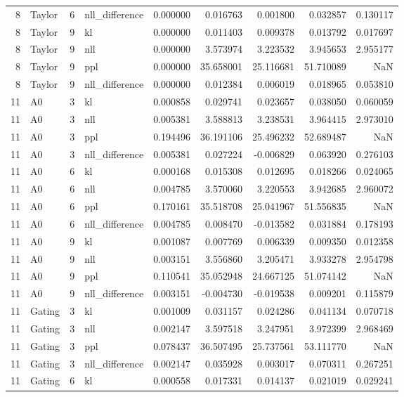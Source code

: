 \begin{tabular}{rlrlrrrrr}
8 & Taylor & 6 & nll_difference & 0.000000 & 0.016763 & 0.001800 & 0.032857 & 0.130117 \\
8 & Taylor & 9 & kl & 0.000000 & 0.011403 & 0.009378 & 0.013792 & 0.017697 \\
8 & Taylor & 9 & nll & 0.000000 & 3.573974 & 3.223532 & 3.945653 & 2.955177 \\
8 & Taylor & 9 & ppl & 0.000000 & 35.658001 & 25.116681 & 51.710089 & NaN \\
8 & Taylor & 9 & nll_difference & 0.000000 & 0.012384 & 0.006019 & 0.018965 & 0.053810 \\
11 & A0 & 3 & kl & 0.000858 & 0.029741 & 0.023657 & 0.038050 & 0.060059 \\
11 & A0 & 3 & nll & 0.005381 & 3.588813 & 3.238531 & 3.964415 & 2.973010 \\
11 & A0 & 3 & ppl & 0.194496 & 36.191106 & 25.496232 & 52.689487 & NaN \\
11 & A0 & 3 & nll_difference & 0.005381 & 0.027224 & -0.006829 & 0.063920 & 0.276103 \\
11 & A0 & 6 & kl & 0.000168 & 0.015308 & 0.012695 & 0.018266 & 0.024065 \\
11 & A0 & 6 & nll & 0.004785 & 3.570060 & 3.220553 & 3.942685 & 2.960072 \\
11 & A0 & 6 & ppl & 0.170161 & 35.518708 & 25.041967 & 51.556835 & NaN \\
11 & A0 & 6 & nll_difference & 0.004785 & 0.008470 & -0.013582 & 0.031884 & 0.178193 \\
11 & A0 & 9 & kl & 0.001087 & 0.007769 & 0.006339 & 0.009350 & 0.012358 \\
11 & A0 & 9 & nll & 0.003151 & 3.556860 & 3.205471 & 3.933278 & 2.954798 \\
11 & A0 & 9 & ppl & 0.110541 & 35.052948 & 24.667125 & 51.074142 & NaN \\
11 & A0 & 9 & nll_difference & 0.003151 & -0.004730 & -0.019538 & 0.009201 & 0.115879 \\
11 & Gating & 3 & kl & 0.001009 & 0.031157 & 0.024286 & 0.041134 & 0.070718 \\
11 & Gating & 3 & nll & 0.002147 & 3.597518 & 3.247951 & 3.972399 & 2.968469 \\
11 & Gating & 3 & ppl & 0.078437 & 36.507495 & 25.737561 & 53.111770 & NaN \\
11 & Gating & 3 & nll_difference & 0.002147 & 0.035928 & 0.003017 & 0.070311 & 0.267251 \\
11 & Gating & 6 & kl & 0.000558 & 0.017331 & 0.014137 & 0.021019 & 0.029241 \\

\end{tabular}
